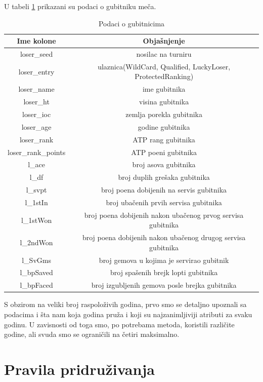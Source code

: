\documentclass[a4paper]{article}
\begin{document}
U tabeli \ref{table:gubitnici} prikazani su podaci o gubitniku meča.
\begin{table}
		\begin{tabular}{ | c | c | } 
			\hline
			Ime kolone & Objašnjenje \\ 
			\hline
			loser\_seed & nosilac na turniru \\
			loser\_entry & ulaznica(WildCard, Qualified, LuckyLoser, ProtectedRanking) \\
			loser\_name & ime gubitnika \\
			loser\_ht & visina gubitnika \\
			loser\_ioc & zemlja porekla gubitnika \\
			loser\_age & godine gubitnika \\
			loser\_rank & ATP rang gubitnika \\
			loser\_rank\_points & ATP poeni gubitnika \\ 
			l\_ace & broj asova gubitnika \\
			l\_df & broj duplih grešaka gubitnika \\
			l\_svpt & broj poena dobijenih na servis gubitnika \\
			l\_1stIn & broj ubačenih prvih servisa gubitnika \\
			l\_1stWon & broj poena dobijenih nakon ubačenog prvog servisa gubitnika \\
			l\_2ndWon & broj poena dobijenih nakon ubačenog drugog servisa gubitnika \\
			l\_SvGms & broj gemova u kojima je servirao gubitnik \\
			l\_bpSaved & broj spašenih brejk lopti gubitnika \\
			l\_bpFaced & broj izgubljenih gemova posle brejka gubitnika \\
			\hline
		\end{tabular}
	\caption{Podaci o gubitnicima}
	\label{table:gubitnici}
\end{table}

S obzirom na veliki broj raspoloživih godina, prvo smo se detaljno upoznali sa podacima i šta nam koja godina pruža i koji su najzanimljiviji atributi za svaku godinu. U zavisnosti od toga smo, po potrebama metoda, koristili različite godine, ali svuda smo se ograničili na četiri maksimalno.

\section{Pravila pridruživanja}
\end{document}
